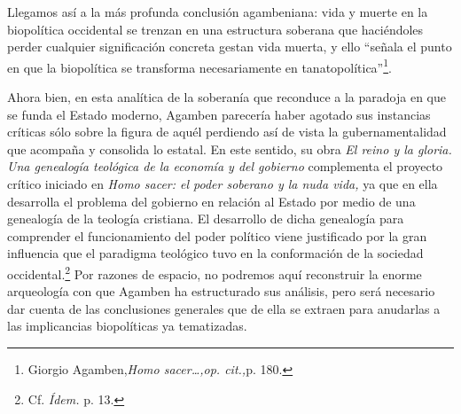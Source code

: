 Llegamos así a la más profunda conclusión agambeniana: vida y muerte en la biopolítica occidental se trenzan en una estructura soberana que haciéndoles perder cualquier significación concreta gestan vida muerta, y ello \enquote{señala el punto en que la biopolítica se transforma necesariamente en tanatopolítica}\footnote{Giorgio Agamben,\emph{Homo sacer\ldots,op. cit.,}p. 180.}.

Ahora bien, en esta analítica de la soberanía que reconduce a la paradoja en que se funda el Estado moderno, Agamben parecería haber agotado sus instancias críticas sólo sobre la figura de aquél perdiendo así de vista la gubernamentalidad que acompaña y consolida lo estatal. En este sentido, su obra \emph{El reino y la gloria. Una genealogía teológica de la economía y del gobierno} complementa el proyecto crítico iniciado en \emph{Homo sacer: el poder soberano y la nuda vida,} ya que en ella desarrolla el problema del gobierno en relación al Estado por medio de una genealogía de la teología cristiana. El desarrollo de dicha genealogía para comprender el funcionamiento del poder político viene justificado por la gran influencia que el paradigma teológico tuvo en la conformación de la sociedad occidental.\footnote{Cf. \emph{Ídem.} p. 13.} Por razones de espacio, no podremos aquí reconstruir la enorme arqueología con que Agamben ha estructurado sus análisis, pero será necesario dar cuenta de las conclusiones generales que de ella se extraen para anudarlas a las implicancias biopolíticas ya tematizadas.

